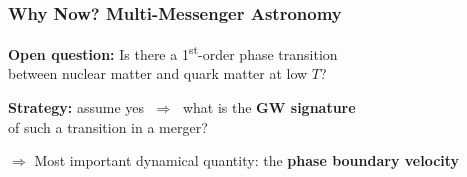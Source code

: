 \documentclass{beamer}
\newcommand{\bi}{\begin{itemize}}
\newcommand{\ei}{\end{itemize}}
\newcommand{\red}{\color{WashURed}}
\begin{document}
\begin{frame}
\frametitle{Why Now? Multi-Messenger Astronomy}

%
%

\textbf{Open question:} Is there a 1\textsuperscript{st}-order phase transition\\
\hspace{2.7em} between nuclear matter and quark matter at low $T$?

\vspace{0.5em}
\textbf{Strategy:} assume yes $\;\Rightarrow\;$ what is the \textbf{GW signature}\\
\hspace{3.5em} of such a transition in a merger?

\vspace{0.5em}
{\red$\Rightarrow$ Most important dynamical quantity: the \textbf{phase boundary velocity}}

\end{frame}
\end{document}
